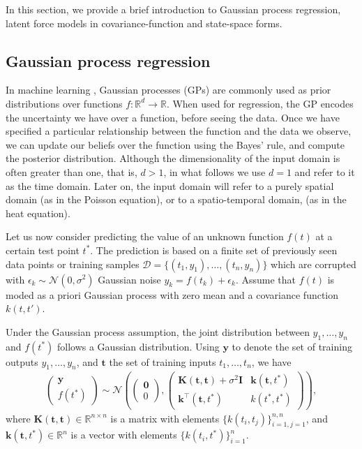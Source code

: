 \documentclass[journal]{IEEEtran}
\begin{document}
In this section, we provide a brief introduction to Gaussian process regression, latent force models in covariance-function and state-space forms.


\subsection{Gaussian process regression}\label{sec:gp:regression}
%

In machine learning \cite{Rasmussen+Williams:2006}, Gaussian processes (GPs) are commonly used as prior distributions over functions $f: \mathbb{R}^d\rightarrow \mathbb{R}$. When used for regression, the GP encodes the uncertainty we have over a function, before seeing the data. Once we have specified a particular relationship between the function and the data we observe, we can update our beliefs over the function using the Bayes' rule, and compute the posterior distribution.  Although the dimensionality of the input domain is often greater than one, that is, $d>1$, in what follows we use $d=1$ and refer to it as the time domain. Later on, the input domain will refer to a purely spatial domain (as in the Poisson equation), or to a spatio-temporal domain, (as in the heat equation). 

Let us now consider predicting the value of an unknown function $f(t)$ at a certain test point $t^*$. The prediction is based on a finite set of previously seen data points or training samples $\mathcal{D}=\{(t_1, y_1), \ldots, (t_n, y_n)\}$ which are corrupted with $\epsilon_k \sim \mathcal{N}(0,\sigma^2)$ Gaussian noise $y_k = f(t_k) + \epsilon_k$. Assume that $f(t)$ is moded as a priori Gaussian process with zero mean and a covariance function $k(t,t')$.

Under the Gaussian process assumption, the joint distribution between $y_1, \ldots, y_n$ and $f(t^*)$ follows a Gaussian distribution. Using $\mathbf{y}$ to denote the set of training outputs $y_1, \ldots, y_n$, and $\mathbf{t}$ the set of training inputs $t_1, \ldots, t_n$, we have
\begin{align*}
\begin{pmatrix}
\mathbf{y}\\
f(t^*)
\end{pmatrix}\sim
\mathcal{N}
\left(
\begin{pmatrix}
\mathbf{0}\\
0
\end{pmatrix},
\begin{pmatrix}
\mathbf{K}(\mathbf{t}, \mathbf{t}) + \sigma^2 \mathbf{I} & \mathbf{k}(\mathbf{t}, t^*)\\
\mathbf{k}^{\top}(\mathbf{t}, t^*) & k(t^*, t^*)
\end{pmatrix}
\right),
\end{align*}
where $\mathbf{K}(\mathbf{t}, \mathbf{t})\in \mathbb{R}^{n\times n}$ is a matrix with elements
$\{k(t_i, t_j)\}_{i=1, j=1}^{n,n}$, and $\mathbf{k}(\mathbf{t}, t^*) \in \mathbb{R}^n$ is a vector with elements
$\{k(t_i, t^*)\}_{i=1}^n$.
\end{document}
